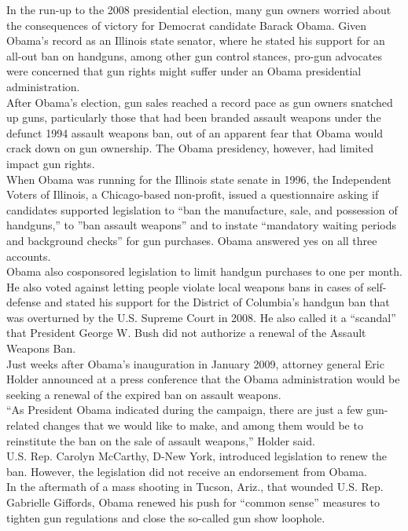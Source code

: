 \begin{tcolorbox}[width=\linewidth,title={Example of a Retrieved Document}]
   In the run-up to the 2008 presidential election, many gun owners worried about the consequences of victory for Democrat candidate Barack Obama. Given Obama’s record as an Illinois state senator, where he stated his support for an all-out ban on handguns, among other gun control stances, pro-gun advocates were concerned that gun rights might suffer under an Obama presidential administration.\\
After Obama’s election, gun sales reached a record pace as gun owners snatched up guns, particularly those that had been branded assault weapons under the defunct 1994 assault weapons ban, out of an apparent fear that Obama would crack down on gun ownership. The Obama presidency, however, had limited impact gun rights.\\
When Obama was running for the Illinois state senate in 1996, the Independent Voters of Illinois, a Chicago-based non-profit, issued a questionnaire asking if candidates supported legislation to ``ban the manufacture, sale, and possession of handguns,” to ''ban assault weapons” and to instate “mandatory waiting periods and background checks” for gun purchases. Obama answered yes on all three accounts.\\
Obama also cosponsored legislation to limit handgun purchases to one per month. He also voted against letting people violate local weapons bans in cases of self-defense and stated his support for the District of Columbia’s handgun ban that was overturned by the U.S. Supreme Court in 2008. He also called it a “scandal” that President George W. Bush did not authorize a renewal of the Assault Weapons Ban.\\
Just weeks after Obama’s inauguration in January 2009, attorney general Eric Holder announced at a press conference that the Obama administration would be seeking a renewal of the expired ban on assault weapons.\\
``As President Obama indicated during the campaign, there are just a few gun-related changes that we would like to make, and among them would be to reinstitute the ban on the sale of assault weapons,” Holder said.\\
U.S. Rep. Carolyn McCarthy, D-New York, introduced legislation to renew the ban. However, the legislation did not receive an endorsement from Obama.\\
In the aftermath of a mass shooting in Tucson, Ariz., that wounded U.S. Rep. Gabrielle Giffords, Obama renewed his push for “common sense” measures to tighten gun regulations and close the so-called gun show loophole.\\

\end{tcolorbox}
